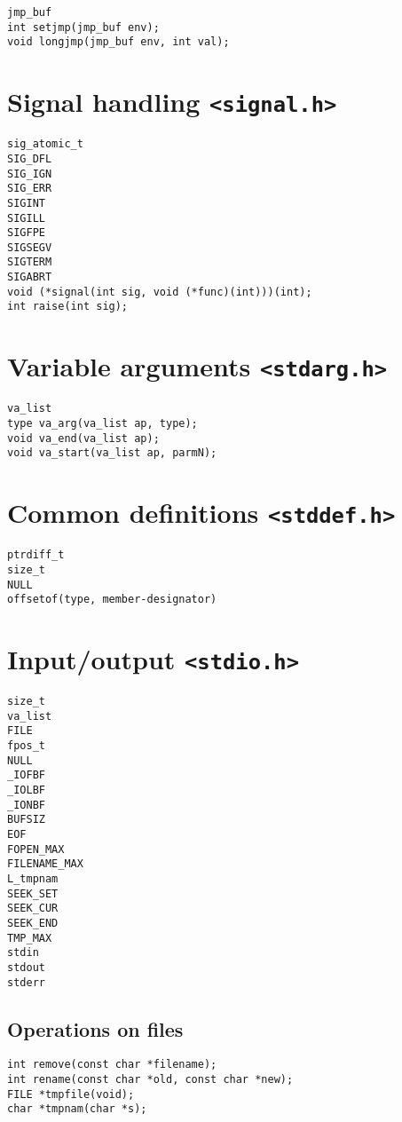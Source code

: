 \documentclass[a4paper,11pt,draft]{article}
\begin{document}
\begin{verbatim}
jmp_buf
int setjmp(jmp_buf env);
void longjmp(jmp_buf env, int val);
\end{verbatim}

\section*{Signal handling {\tt <signal.h>}}

\begin{verbatim}
sig_atomic_t
SIG_DFL
SIG_IGN
SIG_ERR
SIGINT
SIGILL
SIGFPE
SIGSEGV
SIGTERM
SIGABRT
void (*signal(int sig, void (*func)(int)))(int);
int raise(int sig);
\end{verbatim}

\section*{Variable arguments {\tt <stdarg.h>}}

\begin{verbatim}
va_list
type va_arg(va_list ap, type);
void va_end(va_list ap);
void va_start(va_list ap, parmN);
\end{verbatim}

\section*{Common definitions {\tt <stddef.h>}}

\begin{verbatim}
ptrdiff_t
size_t
NULL
offsetof(type, member-designator)
\end{verbatim}

\newpage

\section*{Input/output {\tt <stdio.h>}}

\begin{verbatim}
size_t
va_list
FILE
fpos_t
NULL
_IOFBF
_IOLBF
_IONBF
BUFSIZ
EOF
FOPEN_MAX
FILENAME_MAX
L_tmpnam
SEEK_SET
SEEK_CUR
SEEK_END
TMP_MAX
stdin
stdout
stderr
\end{verbatim}

\subsection*{Operations on files}

\begin{verbatim}
int remove(const char *filename);
int rename(const char *old, const char *new);
FILE *tmpfile(void);
char *tmpnam(char *s);
\end{verbatim}
\end{document}
